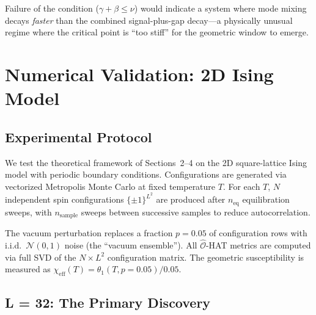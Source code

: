 \documentclass[aps,prl,twocolumn,superscriptaddress,byrevtex]{article}
\begin{document}
Failure of the condition ($\gamma + \beta \leq \nu$) would indicate a system where mode mixing decays \emph{faster} than the combined signal-plus-gap decay---a physically unusual regime where the critical point is ``too stiff'' for the geometric window to emerge.

\section{Numerical Validation: 2D Ising Model}

\subsection{Experimental Protocol}

We test the theoretical framework of Sections~2--4 on the 2D square-lattice Ising model with periodic boundary conditions. Configurations are generated via vectorized Metropolis Monte Carlo at fixed temperature $T$. For each $T$, $N$ independent spin configurations $\{\pm 1\}^{L^2}$ are produced after $n_{\text{eq}}$ equilibration sweeps, with $n_{\text{sample}}$ sweeps between successive samples to reduce autocorrelation.

The vacuum perturbation replaces a fraction $p = 0.05$ of configuration rows with i.i.d.\ $\mathcal{N}(0,1)$ noise (the ``vacuum ensemble''). All $\hat{\mathcal{O}}$-HAT metrics are computed via full SVD of the $N \times L^2$ configuration matrix. The geometric susceptibility is measured as $\chi_{\text{eff}}(T) = \theta_1(T, p=0.05) / 0.05$.

\subsection{L = 32: The Primary Discovery}
\end{document}
